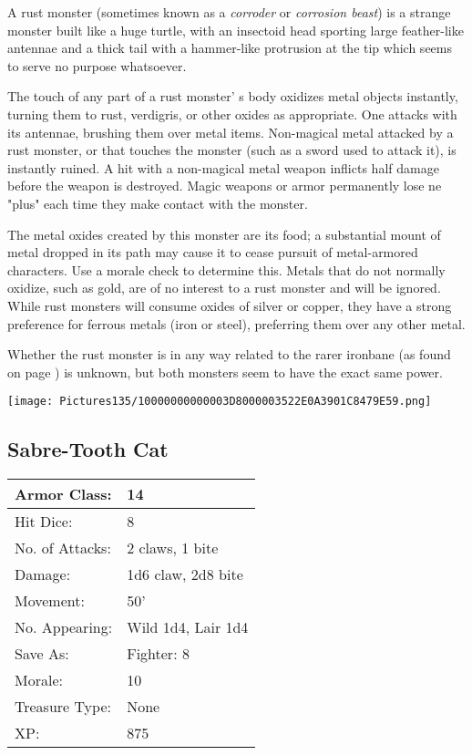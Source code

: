 \documentclass[a4paper,twoside,openany,10pt]{book}
\begin{document}
\begin{multicols}{2}
A rust monster (sometimes known as a \emph{corroder} or \emph{corrosion beast}) is a strange monster built like a huge turtle, with an insectoid head sporting large feather-like antennae and a thick tail with a hammer-like protrusion at the tip which seems to serve no purpose whatsoever.

The touch of any part of a rust monster' s body oxidizes metal objects instantly, turning them to rust, verdigris, or other oxides as appropriate. One attacks with its antennae, brushing them over metal items. Non-magical metal attacked by a rust monster, or that touches the monster (such as a sword used to attack it), is instantly ruined. A hit with a non-magical metal weapon inflicts half damage before the weapon is destroyed. Magic weapons or armor permanently lose ne "plus" each time they make contact with the monster. 

The metal oxides created by this monster are its food; a substantial mount of metal dropped in its path may cause it to cease pursuit of metal-armored characters. Use a morale check to determine this. Metals that do not normally oxidize, such as gold, are of no interest to a rust monster and will be ignored. While rust monsters will consume oxides of silver or copper, they have a strong preference for ferrous metals (iron or steel), preferring them over any other metal.

Whether the rust monster is in any way related to the rarer ironbane (as found on page \hyperlink{ironbane}{\pageref{ironbane}}) is unknown, but both monsters seem to have the exact same power.

\begin{center} \texttt{[image: Pictures135/10000000000003D8000003522E0A3901C8479E59.png]} \end{center}

\subsection*{Sabre-Tooth Cat}\label{sabre-tooth-cat}

\begin{tabularx}{0.50\textwidth}{@{}lX@{}}
Armor Class: & 14 \\\hline
Hit Dice: & 8 \\\hline
No. of Attacks: & 2 claws, 1 bite \\\hline
Damage: & 1d6 claw, 2d8 bite \\\hline
Movement: & 50' \\\hline
No. Appearing: & Wild 1d4, Lair 1d4 \\\hline
Save As: & Fighter: 8 \\\hline
Morale: & 10 \\\hline
Treasure Type: & None \\\hline
XP: & 875 \\\hline
\end{tabularx}\medskip


\end{multicols}
\end{document}
